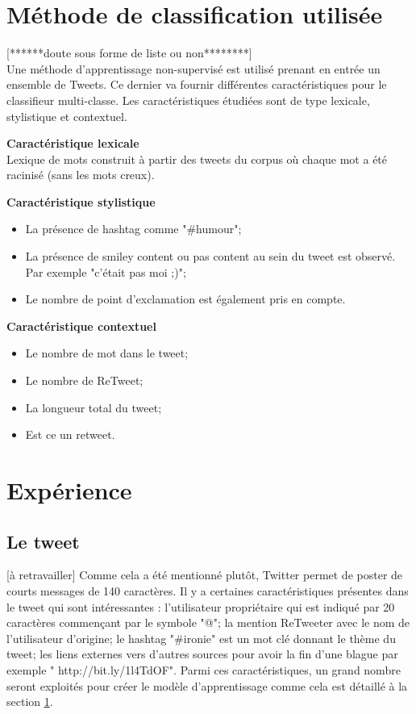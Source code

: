 \documentclass[10pt,a4paper,twoside]{article}
\begin{document}
\section{Méthode de classification utilisée}
\label{features} [******doute sous forme de liste ou non********]\\
Une méthode d'apprentissage non-supervisé est utilisé prenant en entrée un ensemble de Tweets. Ce dernier va fournir différentes caractéristiques pour le classifieur multi-classe. Les caractéristiques étudiées sont de type lexicale, stylistique et contextuel. 

\textbf{Caractéristique lexicale}\\
Lexique de mots construit à partir des tweets du corpus où chaque mot a été racinisé (sans les mots creux).
\vspace{0.5cm}

\textbf{Caractéristique stylistique}
\begin{itemize}
\item La présence de hashtag comme "\#humour";
\item La présence de smiley content ou pas content au sein du tweet est observé. Par exemple "c'était pas moi ;)";
\item Le nombre de point d'exclamation est également pris en compte. 
\end{itemize}
\vspace{0.5cm}

\textbf{Caractéristique contextuel}
\begin{itemize}
\item Le nombre de mot dans le tweet;
\item Le nombre de ReTweet;
\item La longueur total du tweet;
\item Est ce un retweet.
\end{itemize}
\vspace{0.5cm}


\section{Expérience}

\subsection{Le tweet} [à retravailler]
Comme cela a été mentionné plutôt, Twitter permet de poster de courts messages de 140 caractères. Il y a certaines caractéristiques présentes dans le tweet qui sont intéressantes : l'utilisateur propriétaire qui est indiqué par 20 caractères commençant par le symbole "@"; la mention ReTweeter avec le nom de l'utilisateur d'origine; le hashtag "\#ironie" est un mot clé donnant le thème du tweet; les liens externes vers d'autres sources pour avoir la fin d'une blague par exemple " http://bit.ly/1l4TdOF". Parmi ces caractéristiques, un grand nombre seront exploités pour créer le modèle d'apprentissage comme cela est détaillé à la section \ref{features}.
\end{document}
